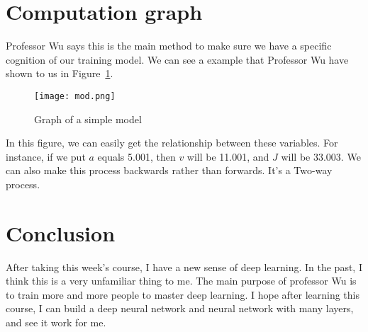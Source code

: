 \documentclass[a4paper]{article}
\begin{document}
\section{Computation graph}
Professor Wu says this is the main method to make sure we have a specific cognition of our training model. We can see a example that Professor Wu have shown to us in Figure~\ref{Figure2}.
 \begin{figure}[!htbp]
 \centering
 \texttt{[image: mod.png]}\\
 \caption{Graph of a simple model}\label{Figure2}
 \end{figure}
\par In this figure, we can easily get the relationship between these variables. For instance, if we put $a$ equals 5.001, then $v$ will be 11.001, and $J$ will be 33.003. We can also make this process backwards rather than forwards. It's a Two-way process.
\section{Conclusion}
After taking this week's course, I have a new sense of deep learning. In the past, I think this is a very unfamiliar thing to me. The main purpose of professor Wu is to train more and more people to master deep learning. I hope after learning this course, I can build a deep neural network and neural network with many layers, and see it work for me.
\end{document}

